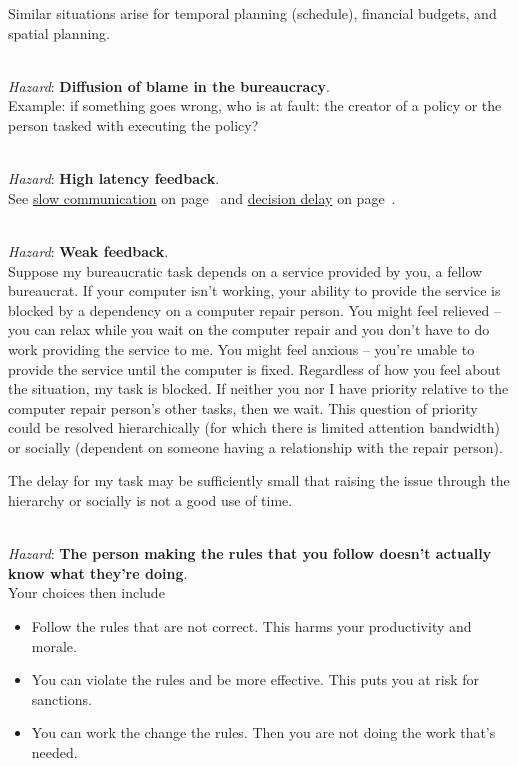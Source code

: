 Similar situations arise for temporal planning (schedule), financial budgets, and spatial planning. 


\ \\
\textit{Hazard}: \textbf{Diffusion of blame in the bureaucracy}. \\
Example: if something goes wrong, who is at fault: the creator of a policy or the person tasked with executing the policy?

\ \\
\textit{Hazard}: \textbf{High latency feedback}. \\
See 
\hyperref[sec:slowing-communication]{slow communication} on
page~\pageref{sec:slowing-communication} 
and 
\hyperref[sec:decision-delay]{decision delay} on 
page~\pageref{sec:decision-delay}.

\ \\
\textit{Hazard}: \textbf{Weak feedback}. \\
Suppose my bureaucratic task depends on a service provided by you, a fellow bureaucrat. If your computer isn't working, your ability to provide the service is blocked by a dependency on a computer repair person. You might feel relieved -- you can relax while you wait on the computer repair and you don't have to do work providing the service to me. You might feel anxious -- you're unable to provide the service until the computer is fixed. Regardless of how you feel about the situation, my task is blocked. If neither you nor I have priority relative to the computer repair person's other tasks, then we wait. This question of priority could be resolved hierarchically (for which there is limited attention bandwidth) or socially (dependent on someone having a relationship with the repair person). 

The delay for my task may be sufficiently small that raising the issue through the hierarchy or socially is not a good use of time.

\ \\
\textit{Hazard}: \textbf{The person making the rules that you follow doesn't actually know what they're doing}. \\
Your choices then include
\begin{itemize}
    \item Follow the rules that are not correct. This harms your productivity and morale. 
\item You can violate the rules and be more effective. This puts you at risk for sanctions. 
\item You can work the change the rules. Then you are not doing the work that's needed.
\end{itemize}


